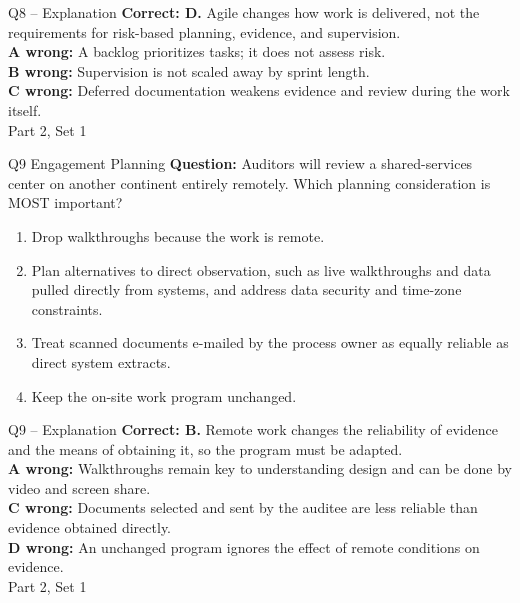 \documentclass[aspectratio=169,10pt]{beamer}
\begin{document}
\begin{frame}[t]{Q8 -- Explanation}
	\footnotesize
	\textbf{Correct: D.} Agile changes how work is delivered, not the requirements for risk-based planning, evidence, and supervision. \\[5pt]
\textbf{A wrong:} A backlog prioritizes tasks; it does not assess risk. \\[3pt]
\textbf{B wrong:} Supervision is not scaled away by sprint length. \\[3pt]
\textbf{C wrong:} Deferred documentation weakens evidence and review during the work itself. \\[3pt]
	\vfill {\tiny Part 2, Set 1}
\end{frame}
\begin{frame}[t]{Q9 \hfill {\scriptsize Engagement Planning}}
	\small
	\textbf{Question:} Auditors will review a shared-services center on another continent entirely remotely. Which planning consideration is MOST important?
	\begin{enumerate}[label=\Alph*.,itemsep=1pt,topsep=3pt]
			\item Drop walkthroughs because the work is remote.
			\item Plan alternatives to direct observation, such as live walkthroughs and data pulled directly from systems, and address data security and time-zone constraints.
			\item Treat scanned documents e-mailed by the process owner as equally reliable as direct system extracts.
			\item Keep the on-site work program unchanged.
	\end{enumerate}
\end{frame}
\begin{frame}[t]{Q9 -- Explanation}
	\footnotesize
	\textbf{Correct: B.} Remote work changes the reliability of evidence and the means of obtaining it, so the program must be adapted. \\[5pt]
\textbf{A wrong:} Walkthroughs remain key to understanding design and can be done by video and screen share. \\[3pt]
\textbf{C wrong:} Documents selected and sent by the auditee are less reliable than evidence obtained directly. \\[3pt]
\textbf{D wrong:} An unchanged program ignores the effect of remote conditions on evidence. \\[3pt]
	\vfill {\tiny Part 2, Set 1}
\end{frame}
\end{document}
